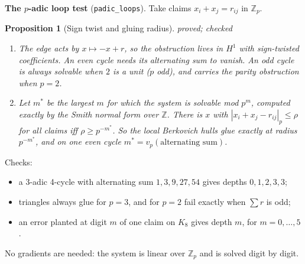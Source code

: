 \documentclass[11pt]{article}
\newtheorem{proposition}[theorem]{Proposition}
\theoremstyle{definition}
\theoremstyle{remark}
\newcommand{\Z}{\mathbb{Z}}
\newcommand{\st}[1]{\textsf{\small\color{gray}#1}}
\begin{document}
\textbf{The $p$-adic loop test} (\texttt{padic\_loops}). Take claims $x_i+x_j=r_{ij}$ in $\Z_p$.
\begin{proposition}[Sign twist and gluing radius]\label{prop:padicradius}\st{proved; checked}
\leavevmode
\begin{enumerate}
  \item The edge acts by $x\mapsto -x+r$, so the obstruction lives in $H^1$ with sign-twisted coefficients. An even cycle needs its alternating sum to vanish. An odd cycle is always solvable when $2$ is a unit ($p$ odd), and carries the parity obstruction when $p=2$.
  \item Let $m^*$ be the largest $m$ for which the system is solvable mod $p^m$, computed exactly by the Smith normal form over $\Z$. There is $x$ with $|x_i+x_j-r_{ij}|_p\le\rho$ for all claims iff $\rho\ge p^{-m^*}$. So the local Berkovich hulls glue exactly at radius $p^{-m^*}$, and on one even cycle $m^*=v_p(\text{alternating sum})$.
\end{enumerate}
\end{proposition}
Checks:
\begin{itemize}
  \item a 3-adic 4-cycle with alternating sum $1,3,9,27,54$ gives depths $0,1,2,3,3$;
  \item triangles always glue for $p=3$, and for $p=2$ fail exactly when $\sum r$ is odd;
  \item an error planted at digit $m$ of one claim on $K_8$ gives depth $m$, for $m=0,\dots,5$.
\end{itemize}
No gradients are needed: the system is linear over $\Z_p$ and is solved digit by digit.
\end{document}
